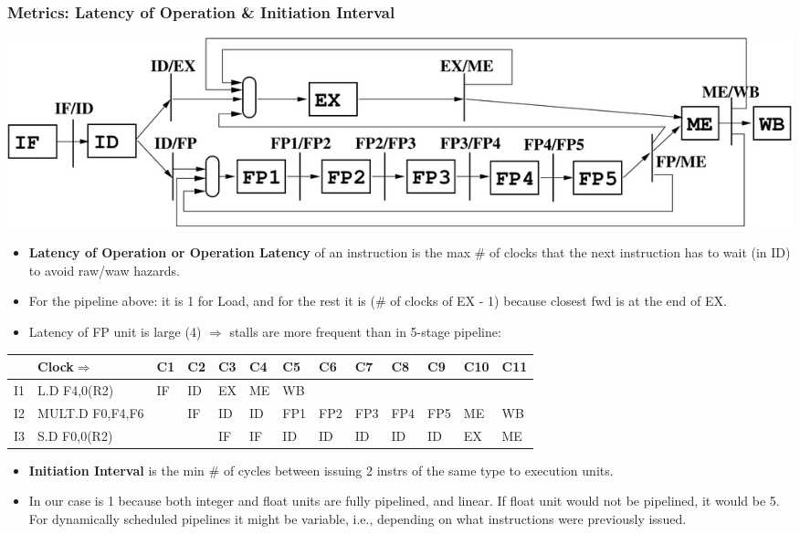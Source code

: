 \documentclass{beamer}
\renewcommand{\emph}[1]{\textcolor{structure}{#1}}
\newcommand{\emp}[1]{\textcolor{DikuRed}{ #1}}
\begin{document}
\begin{frame}[fragile,t]
\frametitle{Metrics: Latency of Operation \& Initiation Interval}

\includegraphics[width=53ex]{Figures/SimpleOoOPipeline}

\bigskip

\begin{scriptsize}
\begin{itemize}
\item \emp{\bf Latency of Operation or Operation Latency} of an instruction 
        is the max \# of clocks that the next instruction has to wait (in ID) 
        to avoid {\sc raw}/{\sc waw} hazards.\smallskip
\item \alert{For the pipeline above: it is 1 for Load, and for the rest it is 
        (\# of clocks of EX - 1) because closest fwd is at the end of EX.} 

\item Latency of FP unit is large (4) $\Rightarrow$ stalls are more frequent than in 5-stage pipeline:
\end{itemize}

\begin{tiny}
\begin{tabular}{lllllllllllll}
\hline
   & Clock$\Rightarrow$ & C1 & C2 & C3 & C4 & C5 & C6 & C7 & C8 & C9 & C10 & C11            \\\hline
I1 & L.D    F4,0(R2)     & IF & ID & EX & ME & \emp{WB} &    &    &    & & &                \\
I2 & MULT.D F0,F4,F6     &    & IF & ID & ID & \emph{FP1} & FP2 & FP3 & FP4 & FP5 & \emp{ME} & WB \\
I3 & S.D    F0,0(R2)     &    &    & IF & IF & ID & ID & ID & ID & ID & \emph{EX} & ME  \\\hline
\end{tabular}
\end{tiny}
\bigskip

\begin{itemize}
\item \emp{\bf Initiation Interval} is the min \# of cycles between issuing 2 instrs
            of the same type to execution units.\smallskip
\item In our case is 1 because both integer and float units are fully pipelined,
        and linear. If float unit would not be pipelined, it would be 5.
      For dynamically scheduled pipelines it might be variable, 
        i.e., depending on what instructions were previously issued.
\end{itemize}
\end{scriptsize}
\end{frame}
\end{document}
